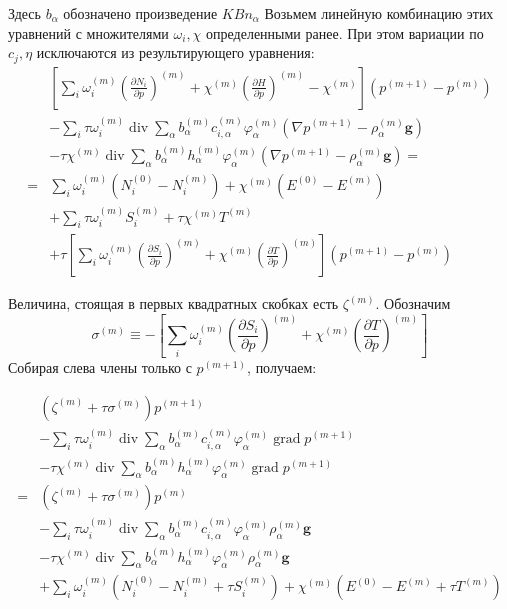 \documentclass[12pt]{article}
\newcommand{\pd}[2]{\frac{\partial #1}{\partial #2}}
\renewcommand{\div}{\operatorname{div}}
\newcommand{\grad}{\operatorname{grad}}
\begin{document}
Здесь $b_\alpha$ обозначено произведение $KB n_\alpha$
Возьмем линейную комбинацию этих уравнений с 
множителями $\omega_i, \chi$ определенными ранее. При этом вариации по $c_j,
\eta$ исключаются из результирующего уравнения:
\begin{align*}
&\left[
\sum_i\omega_i^{(m)}\left(\pd{N_i}{p}\right)^{(m)} +
\chi^{(m)}\left(\pd{H}{p}\right)^{(m)} - \chi^{(m)}\right]
(p^{(m+1)} - p^{(m)})\\
&-\sum_i\tau\omega_i^{(m)}\div \sum_\alpha 
b_\alpha^{(m)} 
c_{i,\alpha}^{(m)} 
\varphi_\alpha^{(m)}
\left(\nabla p^{(m+1)} - \rho^{(m)}_\alpha \mathbf{g}\right)\\
&-\tau\chi^{(m)}\div \sum_\alpha 
b_\alpha^{(m)} 
h_{\alpha}^{(m)} 
\varphi_\alpha^{(m)}
\left(\nabla p^{(m+1)} - \rho^{(m)}_\alpha \mathbf{g}\right) = \\
= &\sum_i \omega_i^{(m)}\left(N_i^{(0)} - N_i^{(m)}\right) + 
\chi^{(m)} \left(E^{(0)} - E^{(m)}\right)\\
&+ \sum_i \tau \omega_i^{(m)} S_i^{(m)} + \tau\chi^{(m)} T^{(m)} \\
&+ \tau 
\left[\sum_i \omega_i^{(m)} \left(\pd{S_i}{p}\right)^{(m)}
+ \chi^{(m)}\left(\pd{T}{p}\right)^{(m)} \right]
(p^{(m+1)} - p^{(m)})
\end{align*}

Величина, стоящая в первых квадратных скобках есть $\zeta^{(m)}$.
Обозначим 
\[
\sigma^{(m)} \equiv -\left[\sum_i \omega_i^{(m)} \left(\pd{S_i}{p}\right)^{(m)}
+ \chi^{(m)}\left(\pd{T}{p}\right)^{(m)}\right]
\]
Собирая слева члены только с $p^{(m+1)}$, получаем:

\begin{align*}
&\left(\zeta^{(m)} + \tau\sigma^{(m)}\right) p^{(m+1)}\\
&-\sum_i\tau\omega_i^{(m)}\div \sum_\alpha 
b_\alpha^{(m)} 
c_{i,\alpha}^{(m)} 
\varphi_\alpha^{(m)}
\grad p^{(m+1)} \\
&-\tau\chi^{(m)}\div \sum_\alpha 
b_\alpha^{(m)} 
h_{\alpha}^{(m)} 
\varphi_\alpha^{(m)}
\grad p^{(m+1)} \\
{}={} &\left(\zeta^{(m)} + \tau\sigma^{(m)}\right) p^{(m)}\\
&-\sum_i\tau\omega_i^{(m)}\div \sum_\alpha 
b_\alpha^{(m)} 
c_{i,\alpha}^{(m)} 
\varphi_\alpha^{(m)}
\rho^{(m)}_\alpha \mathbf{g}\\
&-\tau\chi^{(m)}\div \sum_\alpha 
b_\alpha^{(m)} 
h_{\alpha}^{(m)} 
\varphi_\alpha^{(m)}
\rho^{(m)}_\alpha \mathbf{g} \\
&+\sum_i \omega_i^{(m)}\left(N_i^{(0)} - N_i^{(m)} + \tau S_i^{(m)}\right) + 
\chi^{(m)} \left(E^{(0)} - E^{(m)} + \tau T^{(m)}\right)
\end{align*}
\end{document}

